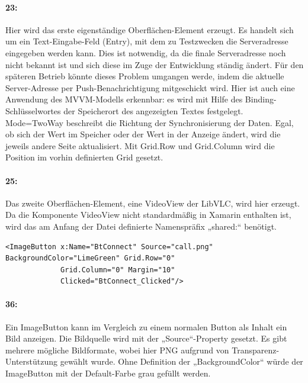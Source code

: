 \paragraph{23:} Hier wird das erste eigenständige Oberflächen-Element erzeugt. Es handelt sich um ein Text-Eingabe-Feld (Entry), mit dem zu Testzwecken die Serveradresse eingegeben werden kann. Dies ist notwendig, da die finale Serveradresse noch nicht bekannt ist und sich diese im Zuge der Entwicklung ständig ändert. Für den späteren Betrieb könnte dieses Problem umgangen werde, indem die aktuelle Server-Adresse per Push-Benachrichtigung mitgeschickt wird. Hier ist auch eine Anwendung des MVVM-Modells erkennbar: es wird mit Hilfe des Binding-Schlüsselwortes der Speicherort des angezeigten Textes festgelegt. Mode=TwoWay beschreibt die Richtung der Synchronisierung der Daten. Egal, ob sich der Wert im Speicher oder der Wert in der Anzeige ändert, wird die jeweils andere Seite aktualisiert. Mit Grid.Row und Grid.Column wird die Position im vorhin definierten Grid gesetzt.
\paragraph{25:} Das zweite Oberflächen-Element, eine VideoView der LibVLC, wird hier erzeugt. Da die Komponente VideoView nicht standardmäßig in Xamarin enthalten ist, wird das am Anfang der Datei definierte Namenspräfix „shared:“ benötigt.

\begin{verbatim}
<ImageButton x:Name="BtConnect" Source="call.png" BackgroundColor="LimeGreen" Grid.Row="0"
             Grid.Column="0" Margin="10"
             Clicked="BtConnect_Clicked"/>
\end{verbatim}
\paragraph{36:} Ein ImageButton kann im Vergleich zu einem normalen Button als Inhalt ein Bild anzeigen. Die Bildquelle wird mit der „Source“-Property gesetzt. Es gibt mehrere mögliche Bildformate, wobei hier PNG aufgrund von Transparenz-Unterstützung gewählt wurde. Ohne Definition der „BackgroundColor“ würde der ImageButton mit der Default-Farbe grau gefüllt werden.
